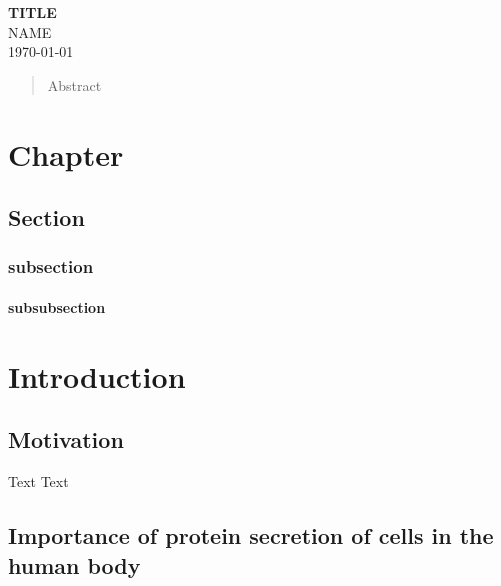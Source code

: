\documentclass[12pt,a4paper]{report}
\begin{document}
\begin{titlepage}
\begin{center}
{ \huge \bfseries TITLE}\\[2.5cm]
{\large NAME}\\[7cm]
{\large \today}
\end{center}
\end{titlepage}

\newpage
\thispagestyle{empty}
\mbox{}

\begin{abstract}
\thispagestyle{plain}
\setcounter{page}{3}
Abstract\par
\end{abstract}
\newpage
\thispagestyle{empty}
\mbox{}
\setcounter{page}{4}
\tableofcontents
\newpage
\thispagestyle{empty}
\mbox{}
\setcounter{page}{0}

\chapter{Chapter}
\section{Section}
\subsection{subsection}
\subsubsection{subsubsection}


\chapter{Introduction}

\section{Motivation}

Text
Text


\section{Importance of protein secretion of cells in the human body}
\end{document}

